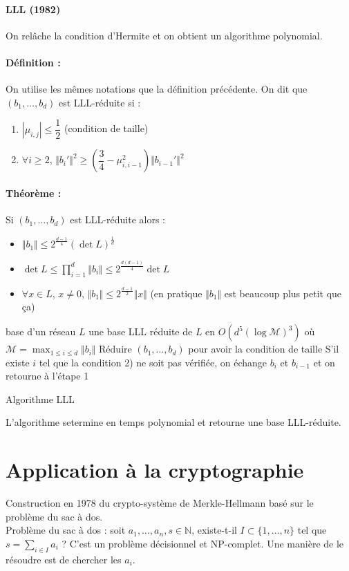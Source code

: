\documentclass[12pt,a4paper]{report}
\begin{document}
\paragraph{LLL (1982)\\}
On rel\^ache la condition d'Hermite et on obtient un algorithme polynomial.
\paragraph{Définition :\\}
On utilise les m\^emes notations que la définition précédente.
On dit que $(b_1,\ldots,b_d)$ est LLL-réduite si :
\begin{enumerate}
\item $|\mu_{i,j}| \leqslant \dfrac{1}{2} $ (condition de taille)
\item $\forall i \geqslant 2$, $\Vert b_i' \Vert ^2 \geqslant \left(\dfrac{3}{4} - \mu_{i,i-1}^2 \right) \Vert b_{i-1}' \Vert ^2 $
\end{enumerate}
\paragraph{Théorème :\\}
Si $(b_1,\ldots,b_d)$ est LLL-réduite alors :
\begin{itemize}
\item $\Vert b_1 \Vert \leqslant 2^{\frac{d-1}{4}} (\det L)^{\frac{1}{d}} $
\item $\det L \leqslant \displaystyle \prod_{i=1}^d \Vert b_i \Vert \leqslant 2^{\frac{d(d-1)}{4}} \det L $
\item $\forall x \in L$, $x \neq 0$, $\Vert b_1 \Vert \leqslant 2^{\frac{d-1}{2}} \Vert x \Vert $ (en pratique $\Vert b_1 \Vert $ est beaucoup plus petit que ça)
\end{itemize}
\begin{algorithm}[h!]
\begin{algorithmic}
\REQUIRE base d'un réseau $L$
\ENSURE une base LLL réduite de $L$ en $O(d^5(\log \mathcal{M})^3)$ où $\mathcal{M} = \max_{1\leqslant i \leqslant d} \Vert b_i \Vert $
\STATE Réduire $(b_1,\ldots,b_d)$ pour avoir la condition de taille
\STATE S'il existe $i$ tel que la condition 2) ne soit pas vérifiée, on échange $b_i$ et $b_{i-1}$ et on retourne à l'étape 1
\end{algorithmic}
\caption{Algorithme LLL}
\end{algorithm}
L'algorithme setermine en temps polynomial et retourne une base LLL-réduite.
\section{Application à la cryptographie}
Construction en 1978 du crypto-système de Merkle-Hellmann basé sur le problème du sac à dos.\\
Problème du sac à dos : soit $a_1,\ldots,a_n,s \in \mathbb{N}$, existe-t-il $I \subset \{1,\ldots,n\}$ tel que $s=\displaystyle \sum_{i \in I} a_i $ ? C'est un problème décisionnel et NP-complet. Une manière de le résoudre est de chercher les $a_i$.
\end{document}
